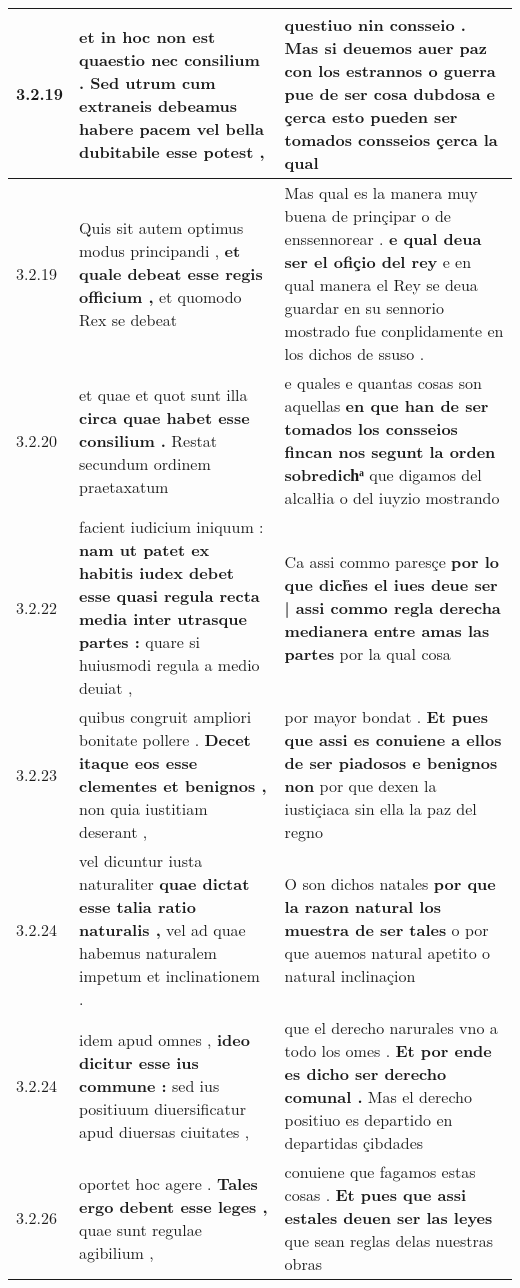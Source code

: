 \begin{tabular}{|p{1cm}|p{6.5cm}|p{6.5cm}|}
3.2.19 & et in hoc non est quaestio nec consilium . \textbf{ Sed utrum cum extraneis debeamus habere pacem } vel bella dubitabile esse potest , & questiuo nin consseio . \textbf{ Mas si deuemos auer paz con los estrannos o guerra pue de ser cosa dubdosa } e çerca esto pueden ser tomados consseios çerca la qual \\\hline
3.2.19 & Quis sit autem optimus modus principandi , \textbf{ et quale debeat esse regis officium , } et quomodo Rex se debeat & Mas qual es la manera muy buena de prinçipar o de enssennorear . \textbf{ e qual deua ser el ofiçio del rey } e en qual manera el Rey se deua guardar en su sennorio mostrado fue conplidamente en los dichos de ssuso . \\\hline
3.2.20 & et quae et quot sunt illa \textbf{ circa quae habet esse consilium . } Restat secundum ordinem praetaxatum & e quales e quantas cosas son aquellas \textbf{ en que han de ser tomados los consseios fincan nos segunt la orden sobredichͣ } que digamos del alcalłia o del iuyzio mostrando \\\hline
3.2.22 & facient iudicium iniquum : \textbf{ nam ut patet ex habitis iudex debet esse quasi regula recta media inter utrasque partes : } quare si huiusmodi regula a medio deuiat , & Ca assi commo paresçe \textbf{ por lo que dich̉es el iues deue ser | assi commo regla derecha medianera entre amas las partes } por la qual cosa \\\hline
3.2.23 & quibus congruit ampliori bonitate pollere . \textbf{ Decet itaque eos esse clementes et benignos , } non quia iustitiam deserant , & por mayor bondat . \textbf{ Et pues que assi es conuiene a ellos de ser piadosos e benignos non } por que dexen la iustiçiaca sin ella la paz del regno \\\hline
3.2.24 & vel dicuntur iusta naturaliter \textbf{ quae dictat esse talia ratio naturalis , } vel ad quae habemus naturalem impetum et inclinationem . & O son dichos natales \textbf{ por que la razon natural los muestra de ser tales } o por que auemos natural apetito o natural inclinaçion \\\hline
3.2.24 & idem apud omnes , \textbf{ ideo dicitur esse ius commune : } sed ius positiuum diuersificatur apud diuersas ciuitates , & que el derecho narurales vno a todo los omes . \textbf{ Et por ende es dicho ser derecho comunal . } Mas el derecho positiuo es departido en departidas çibdades \\\hline
3.2.26 & oportet hoc agere . \textbf{ Tales ergo debent esse leges , } quae sunt regulae agibilium , & conuiene que fagamos estas cosas . \textbf{ Et pues que assi estales deuen ser las leyes } que sean reglas delas nuestras obras \\\hline

\end{tabular}
